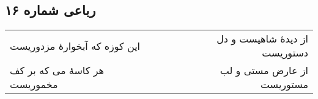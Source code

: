 \begin{center}
\section*{رباعی شماره ۱۶}
\label{sec:sh016}
\begin{longtable}{l p{0.5cm} r}
این کوزه که آبخوارهٔ مزدوریست
&&
از دیدهٔ شاهیست و دل دستوریست
\\
هر کاسهٔ می که بر کف مخموریست
&&
از عارض مستی و لب مستوریست
\\
\end{longtable}
\end{center}
